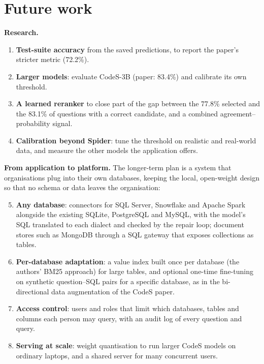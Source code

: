 \section{Future work}

\textbf{Research.}
\begin{enumerate}
	\item \textbf{Test-suite accuracy} from the saved predictions, to report the paper's stricter metric (72.2\%).
	\item \textbf{Larger models}: evaluate CodeS-3B (paper: 83.4\%) and calibrate its own threshold.
	\item \textbf{A learned reranker} to close part of the gap between the 77.8\% selected and the 83.1\% of questions with a correct candidate, and a combined agreement--probability signal.
	\item \textbf{Calibration beyond Spider}: tune the threshold on realistic and real-world data, and measure the other models the application offers.
\end{enumerate}

\textbf{From application to platform.} The longer-term plan is a system that organisations plug into their own databases, keeping the local, open-weight design so that no schema or data leaves the organisation:
\begin{enumerate}
	\setcounter{enumi}{4}
	\item \textbf{Any database}: connectors for SQL Server, Snowflake and Apache Spark alongside the existing SQLite, PostgreSQL and MySQL, with the model's SQL translated to each dialect and checked by the repair loop; document stores such as MongoDB through a SQL gateway that exposes collections as tables.
	\item \textbf{Per-database adaptation}: a value index built once per database (the authors' BM25 approach) for large tables, and optional one-time fine-tuning on synthetic question--SQL pairs for a specific database, as in the bi-directional data augmentation of the CodeS paper.
	\item \textbf{Access control}: users and roles that limit which databases, tables and columns each person may query, with an audit log of every question and query.
	\item \textbf{Serving at scale}: weight quantisation to run larger CodeS models on ordinary laptops, and a shared server for many concurrent users.
\end{enumerate}
